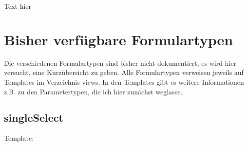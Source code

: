 \documentclass[letterpaper,10pt,ngerman]{sphinxmanual}
\begin{document}
\begin{sphinxVerbatim}[commandchars=\\\{\}]
 
 
\end{sphinxVerbatim}

Text hier
\begin{quote}
\end{quote}


\chapter{Bisher verfügbare Formulartypen}
\label{\detokenize{developer-docs/availableForms:bisher-verfugbare-formulartypen}}\label{\detokenize{developer-docs/availableForms::doc}}
Die verschiedenen Formulartypen sind bisher nicht dokumentiert, es wird hier versucht, eine Kurzübersicht zu geben.
Alle Formulartypen verweisen jeweils auf Templates im Verzeichnis views. In den Templates gibt es weitere Informationen z.B. zu den Parametertypen, die ich hier zunächst weglasse.


\section{singleSelect}
\label{\detokenize{developer-docs/availableForms:singleselect}}
Template: 
\end{document}
